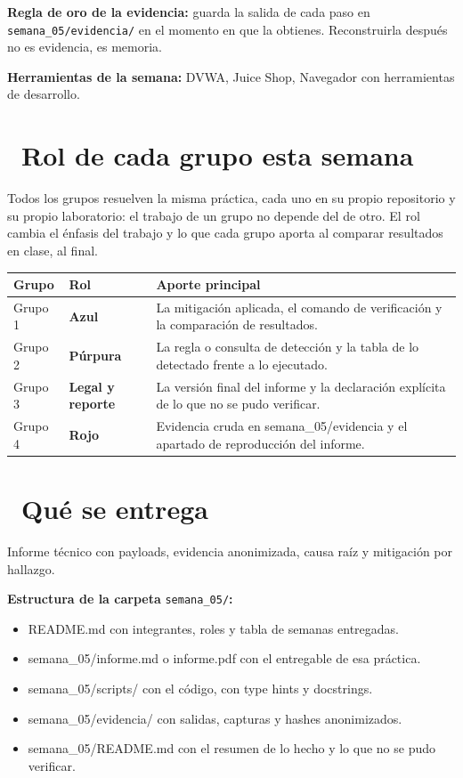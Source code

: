 \documentclass[11pt,a4paper]{article}
\newcommand{\iconotexto}[2]{\textcolor{cyanNeon}{\faIcon{#1}}~#2}
\begin{document}
\begin{cajaConcepto}\textbf{Regla de oro de la evidencia:} guarda la salida de cada paso en \texttt{semana\_05/evidencia/} en el momento en que la obtienes. Reconstruirla después no es evidencia, es memoria.
\end{cajaConcepto}

\textbf{Herramientas de la semana:} DVWA, Juice Shop, Navegador con herramientas de desarrollo.

\section{\iconotexto{users}{Rol de cada grupo esta semana}}

Todos los grupos resuelven la misma práctica, cada uno en su propio repositorio y su propio laboratorio: el trabajo de un grupo no depende del de otro. El rol cambia el énfasis del trabajo y lo que cada grupo aporta al comparar resultados en clase, al final.

\begin{tabularx}{\linewidth}{@{}l l X@{}}
\toprule
Grupo & Rol & Aporte principal\\
\midrule
Grupo 1 & \textbf{Azul} & La mitigación aplicada, el comando de verificación y la comparación de resultados. \\
Grupo 2 & \textbf{Púrpura} & La regla o consulta de detección y la tabla de lo detectado frente a lo ejecutado. \\
Grupo 3 & \textbf{Legal y reporte} & La versión final del informe y la declaración explícita de lo que no se pudo verificar. \\
Grupo 4 & \textbf{Rojo} & Evidencia cruda en semana\_05/evidencia y el apartado de reproducción del informe. \\
\bottomrule
\end{tabularx}

\section{\iconotexto{box-open}{Qué se entrega}}

Informe técnico con payloads, evidencia anonimizada, causa raíz y mitigación por hallazgo.

\textbf{Estructura de la carpeta} \texttt{semana\_05/}\textbf{:}

\begin{itemize}[leftmargin=1.4em,itemsep=2pt,topsep=3pt]
  \item README.md con integrantes, roles y tabla de semanas entregadas.
  \item semana\_05/informe.md o informe.pdf con el entregable de esa práctica.
  \item semana\_05/scripts/ con el código, con type hints y docstrings.
  \item semana\_05/evidencia/ con salidas, capturas y hashes anonimizados.
  \item semana\_05/README.md con el resumen de lo hecho y lo que no se pudo verificar.
\end{itemize}
\end{document}

